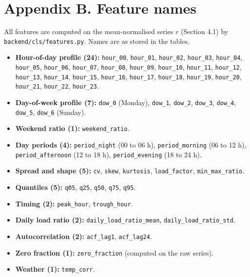 \documentclass[
  10pt,
]{article}
\providecommand{\tightlist}{%
  \setlength{\itemsep}{0pt}\setlength{\parskip}{0pt}}
\begin{document}
\hypertarget{appendix-b.-feature-names}{%
\section{Appendix B. Feature names}\label{appendix-b.-feature-names}}

All features are computed on the mean-normalised series \(r\) (Section
4.1) by \texttt{backend/cls/features.py}. Names are as stored in the
tables.

\begin{itemize}
\tightlist
\item
  \textbf{Hour-of-day profile (24):} \texttt{hour\_00},
  \texttt{hour\_01}, \texttt{hour\_02}, \texttt{hour\_03},
  \texttt{hour\_04}, \texttt{hour\_05}, \texttt{hour\_06},
  \texttt{hour\_07}, \texttt{hour\_08}, \texttt{hour\_09},
  \texttt{hour\_10}, \texttt{hour\_11}, \texttt{hour\_12},
  \texttt{hour\_13}, \texttt{hour\_14}, \texttt{hour\_15},
  \texttt{hour\_16}, \texttt{hour\_17}, \texttt{hour\_18},
  \texttt{hour\_19}, \texttt{hour\_20}, \texttt{hour\_21},
  \texttt{hour\_22}, \texttt{hour\_23}.
\item
  \textbf{Day-of-week profile (7):} \texttt{dow\_0} (Monday),
  \texttt{dow\_1}, \texttt{dow\_2}, \texttt{dow\_3}, \texttt{dow\_4},
  \texttt{dow\_5}, \texttt{dow\_6} (Sunday).
\item
  \textbf{Weekend ratio (1):} \texttt{weekend\_ratio}.
\item
  \textbf{Day periods (4):} \texttt{period\_night} (00 to 06 h),
  \texttt{period\_morning} (06 to 12 h), \texttt{period\_afternoon} (12
  to 18 h), \texttt{period\_evening} (18 to 24 h).
\item
  \textbf{Spread and shape (5):} \texttt{cv}, \texttt{skew},
  \texttt{kurtosis}, \texttt{load\_factor}, \texttt{min\_max\_ratio}.
\item
  \textbf{Quantiles (5):} \texttt{q05}, \texttt{q25}, \texttt{q50},
  \texttt{q75}, \texttt{q95}.
\item
  \textbf{Timing (2):} \texttt{peak\_hour}, \texttt{trough\_hour}.
\item
  \textbf{Daily load ratio (2):} \texttt{daily\_load\_ratio\_mean},
  \texttt{daily\_load\_ratio\_std}.
\item
  \textbf{Autocorrelation (2):} \texttt{acf\_lag1}, \texttt{acf\_lag24}.
\item
  \textbf{Zero fraction (1):} \texttt{zero\_fraction} (computed on the
  raw series).
\item
  \textbf{Weather (1):} \texttt{temp\_corr}.
\end{itemize}
\end{document}
